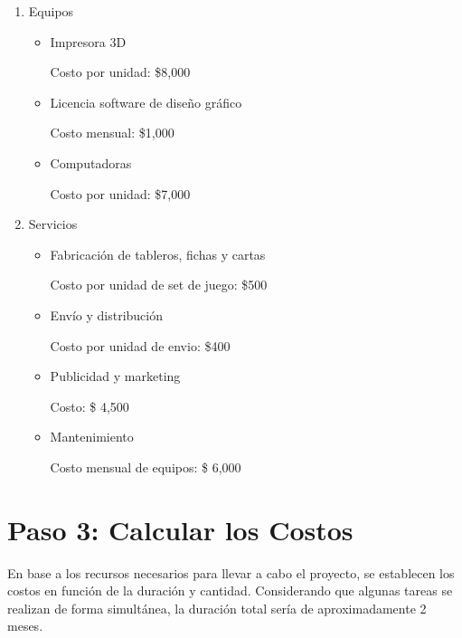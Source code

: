 \documentclass[12pt]{article}
\begin{document}
\begin{enumerate}
	\item Equipos

	\begin{itemize}
		\item Impresora 3D

		Costo por unidad: \$8,000

		\item Licencia software de diseño gráfico

		Costo mensual: \$1,000

		\item Computadoras

		Costo por unidad: \$7,000

	\end{itemize}

	\item Servicios

	\begin{itemize}
		\item Fabricación de tableros, fichas y cartas

		Costo por unidad de set de juego: \$500

		\item Envío y distribución

		Costo por unidad de envio: \$400

		\item Publicidad y marketing

		Costo: \$ 4,500

		\item Mantenimiento

		Costo mensual de equipos: \$ 6,000
	\end{itemize}

\end{enumerate}


 \section*{Paso 3: Calcular los Costos}

 	\noindent En base a los recursos necesarios para llevar a cabo el proyecto, se establecen los costos en función de la duración y cantidad. Considerando que algunas tareas se realizan de forma simultánea, la duración total sería de aproximadamente 2 meses.
\end{document}
